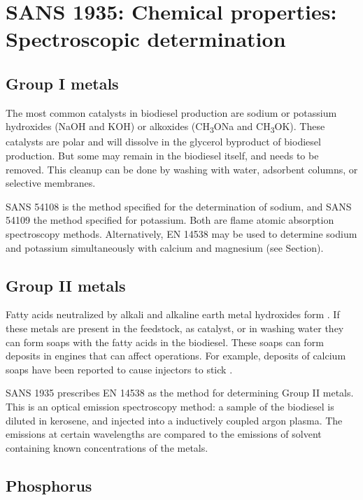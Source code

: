 \section{SANS 1935: Chemical properties: Spectroscopic determination}

\subsection{Group I metals}

The most common catalysts in biodiesel production are sodium or potassium
hydroxides (NaOH and KOH) or alkoxides (CH\textsubscript{3}ONa and
CH\textsubscript{3}OK). These catalysts are polar and will dissolve in the
glycerol byproduct of biodiesel production. But some may remain in the biodiesel
itself, and needs to be removed. This cleanup can be done by washing with water,
adsorbent columns, or selective membranes.

SANS 54108 is the method specified for the determination of sodium, and SANS
54109 the method specified for potassium. Both are flame atomic absorption
spectroscopy methods. Alternatively, EN 14538 may be used to determine sodium
and potassium simultaneously with calcium and magnesium (see
Section\label{sec:GroupIIMetals}).

\subsection{Group II metals}
\label{sec:GroupIIMetals}

Fatty acids neutralized by alkali and alkaline earth metal hydroxides form
. If these metals are present in the feedstock, as catalyst, or
in washing water they can form soaps with the fatty acids in the biodiesel.
These soaps can form deposits in engines that can affect operations. For
example, deposits of calcium soaps have been reported to cause injectors to
stick \autocite{Pischinger2000}.

SANS 1935 prescribes EN 14538 as the method for determining Group II metals.
This is an optical emission spectroscopy method: a sample of the biodiesel is
diluted in kerosene, and injected into a inductively coupled argon plasma. The
emissions at certain wavelengths are compared to the emissions of solvent
containing known concentrations of the metals.

\subsection{Phosphorus}

